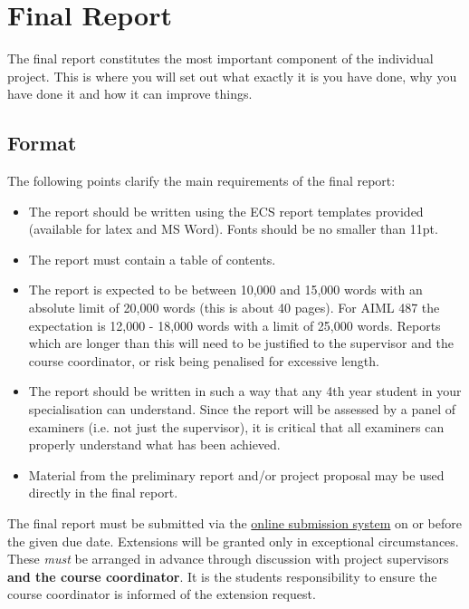 \chapter{Final Report}
The final report constitutes the most important component of the
individual project.  This is where you will set out what exactly it is
you have done, why you have done it and how it can improve things.


\section{Format}
The following points clarify the main requirements of the final
report:
\begin{itemize}
\item The report should be written using the ECS report templates
  provided (available for latex and MS Word).  Fonts should be no
  smaller than 11pt.
\item The report must contain a table of contents.
\item The report is expected to be between 10,000 and 15,000 words with an 
absolute limit of 20,000 words (this is about 40 pages). 
For AIML 487 the expectation is 12,000 - 18,000 words with a limit of 25,000 words. 
Reports which are longer than this will need to be justified to the
supervisor and the course coordinator, or risk being penalised for
excessive length.

\item The report should be written in such a way that any 4th year student in your specialisation
  can understand.  Since the report will be assessed by a panel of
  examiners (i.e. not just the supervisor), it is critical that all
  examiners can properly understand what has been achieved.

\item Material from the preliminary report and/or project proposal may be
  used directly in the final report.
\end{itemize}
The final report must be submitted via the \href{https://apps.ecs.vuw.ac.nz/submit/}{online submission system} on or
before the given due date. Extensions will be granted only in exceptional circumstances. These
\emph{must} be arranged in advance through discussion with project supervisors
{\bf and the course coordinator}. It is the students responsibility to ensure the course coordinator is informed of the extension request. 

